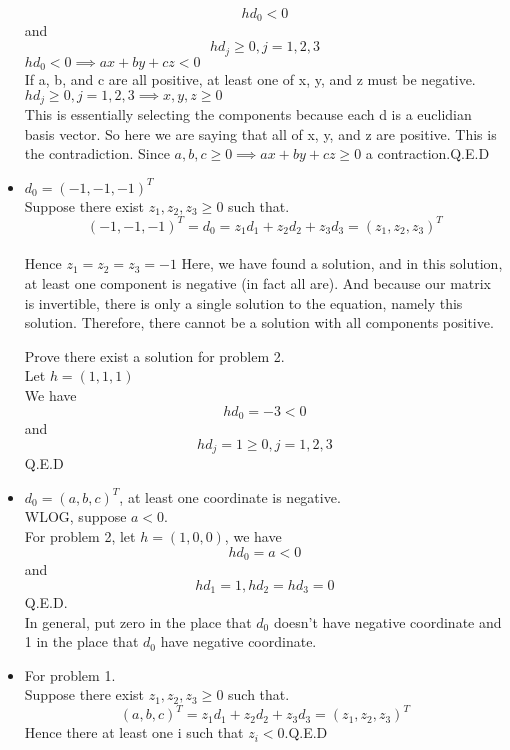 \documentclass[12pt]{article}
\begin{document}
\begin{itemize}
$$hd_{0}<0 $$ and\\
$$hd_{j} \geq 0, j =1,2,3 $$
$hd_{0}<0 \implies ax+by+cz < 0$\\
If a, b, and c are all positive, at least one of x, y, and z must be negative.
$ hd_{j} \geq 0, j =1,2,3 \implies x,y,z \geq 0$\\
This is essentially selecting the components because each d is a euclidian basis vector. So here we are saying that all of x, y, and z are positive. This is the contradiction. Since $a,b,c \geq 0 \implies ax+by+cz \geq 0$ a contraction.Q.E.D

\item $d_{0} = (-1,-1,-1)^{T}$\\
Suppose there exist $z_{1},z_{2},z_{3} \geq 0$ such that.\\
$$(-1,-1,-1)^{T} = d_{0} = z_{1}d_{1}+z_{2}d_{2}
+z_{3}d_{3} = (z_{1},z_{2},z_{3})^{T}$$\\
Hence $z_{1}=z_{2}=z_{3}=-1$ Here, we have found a solution, and in this solution, at least one component is negative (in fact all are).  And because our matrix is invertible, there is only a single solution to the equation, namely this solution. Therefore, there cannot be a solution with all components positive.

Prove there exist a solution for problem 2.\\
Let $h=(1,1,1)$\\
We have
$$hd_{0} = -3<0 $$ and\\
$$hd_{j}  = 1 \geq 0, j =1,2,3 $$Q.E.D

\item $d_{0} = (a,b,c)^{T}$, at least one coordinate is negative.\\
WLOG, suppose $a < 0$.\\
For problem 2, let $h = (1,0,0)$, we have\\
$$hd_{0} = a < 0 $$ and\\
$$hd_{1} = 1, hd_{2} = hd_{3} =0 $$ Q.E.D.\\
In general, put zero in the place that $d_{0} $ doesn't have negative coordinate and 1 in the place that $d_{0} $ have negative coordinate.\\
\item For problem 1.\\
Suppose there exist $z_{1},z_{2},z_{3} \geq 0$ such that.\\
$$(a,b,c)^{T} = z_{1}d_{1}+z_{2}d_{2}+z_{3}d_{3}= (z_{1},z_{2},z_{3})^{T}$$
Hence there at least one i such that $z_{i}<0$.Q.E.D



















\end{itemize}
\end{document}

